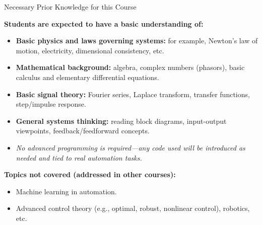 \begin{frame}{Necessary Prior Knowledge for this Course}

\textbf{Students are expected to have a basic understanding of:}
\begin{itemize}
  \item \textbf{Basic physics and laws governing systems:} for example, Newton's law of motion, electricity, dimensional consistency, etc.
  \item \textbf{Mathematical background:} algebra, complex numbers (phasors), basic calculus and elementary differential equations.
  \item \textbf{Basic signal theory:} Fourier series, Laplace transform, transfer functions, step/impulse response.
  \item \textbf{General systems thinking:} reading block diagrams, input-output viewpoints, feedback/feedforward concepts.
  \item \emph{No advanced programming is required—any code used will be introduced as needed and tied to real automation tasks.}
\end{itemize}

\textbf{Topics not covered (addressed in other courses):}
\begin{itemize}
  \item Machine learning in automation.
  \item Advanced control theory (e.g., optimal, robust, nonlinear control), robotics, etc.
\end{itemize}
\end{frame}




